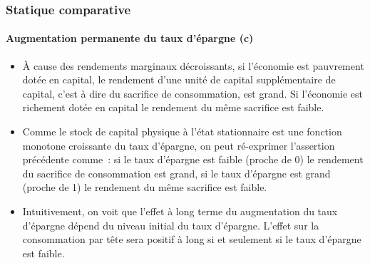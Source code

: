 \documentclass[10pt,notheorems]{beamer}
\theoremstyle{plain}
\theoremstyle{definition} %
\begin{document}
\begin{frame}
  \frametitle{Statique comparative}
  \framesubtitle{Augmentation permanente du taux d'épargne (c)}

  \bigskip

  \begin{itemize}

  \item À cause des rendements marginaux décroissants, si l'économie
    est pauvrement dotée en capital, le rendement d'une unité de
    capital supplémentaire de capital, c'est à dire du sacrifice de
    consommation, est grand. Si l'économie est richement dotée en
    capital le rendement du même sacrifice est faible.\newline

  \item Comme le stock de capital physique à l'état stationnaire est
    une fonction monotone croissante du taux d'épargne, on peut
    ré-exprimer l'assertion précédente comme~: si le taux d'épargne
    est faible (proche de 0) le rendement du sacrifice de consommation
    est grand, si le taux d'épargne est grand (proche de 1) le
    rendement du même sacrifice est faible.\newline

  \item Intuitivement, on voit que l'effet à long terme du
    augmentation du taux d'épargne dépend du niveau initial du taux
    d'épargne. L'effet sur la consommation par tête sera positif à
    long si et seulement si le taux d'épargne est faible.

  \end{itemize}

\end{frame}
\end{document}
